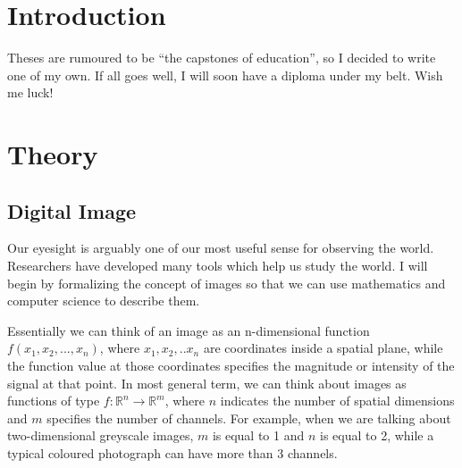 \documentclass[
  digital,     %
  oneside,     %
  nosansbold,  %
  nocolorbold, %
  lof,         %
  lot,         %
]{fithesis4}
\newcommand*{\R}{\ensuremath{\mathbb{R}}}
\begin{document}
\chapter*{Introduction}

Theses are rumoured to be \enquote{the capstones of education}, so
I decided to write one of my own. If all goes well, I will soon
have a diploma under my belt. Wish me luck!

\chapter{Theory}

\section{Digital Image}

Our eyesight is arguably one of our most useful sense for observing the world.
Researchers have developed many tools which help us study the world. I will
begin by formalizing the concept of images so that we can use mathematics
and computer science to describe them.

Essentially we can think of an image as an n-dimensional function $f(x_1, x_2,
..., x_n)$, where $x_1, x_2, .. x_n$ are coordinates inside a spatial plane,
while the function value at those coordinates specifies the magnitude or intensity
of the signal at that point. In most general term, we can think about images as
functions of type $f:\R^n \rightarrow \R^m$, where $n$ indicates the number of
spatial dimensions and $m$ specifies the number of channels. For example, when
we are talking about two-dimensional greyscale images, $m$ is equal to 1 and $n$ is
equal to 2, while a typical coloured photograph can have more than 3 channels.
\end{document}
